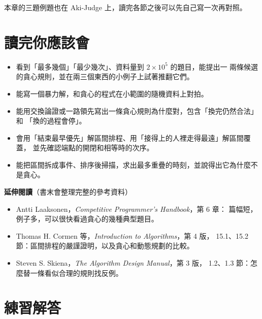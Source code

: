 本章的三題例題也在 Aki-Judge 上，讀完各節之後可以先自己寫一次再對照。

\section{讀完你應該會}
\label{sec:ch7-checklist}

\begin{itemize}
\item 看到「最多幾個」「最少幾次」、資料量到 $2 \times 10^5$ 的題目，能提出一
兩條候選的貪心規則，並在兩三個東西的小例子上試著推翻它們。
\item 能寫一個暴力解，和貪心的程式在小範圍的隨機資料上對拍。
\item 能用交換論證或一路領先寫出一條貪心規則為什麼對，包含「換完仍然合法」和
「換的過程會停」。
\item 會用「結束最早優先」解區間排程、用「接得上的人裡走得最遠」解區間覆蓋，
並先確認端點的開閉和相等時的次序。
\item 能把區間拆成事件、排序後掃描，求出最多重疊的時刻，並說得出它為什麼不
是貪心。
\end{itemize}

\textbf{延伸閱讀}（書末會整理完整的參考資料）

\begin{itemize}
\item Antti Laaksonen，\textit{Competitive Programmer's Handbook}，第 6 章：
篇幅短，例子多，可以很快看過貪心的幾種典型題目。
\item Thomas H. Cormen 等，\textit{Introduction to Algorithms}，第 4 版，
15.1、15.2 節：區間排程的嚴謹證明，以及貪心和動態規劃的比較。
\item Steven S. Skiena，\textit{The Algorithm Design Manual}，第 3 版，
1.2、1.3 節：怎麼替一條看似合理的規則找反例。
\end{itemize}

\section*{練習解答}

